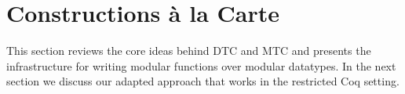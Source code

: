\makeatother
\EndFmtInput
%


























\section{Constructions \`{a} la Carte}
\label{sec:semanticfunctions}


This section reviews the core ideas behind DTC and MTC and presents
the infrastructure for writing modular functions over modular
datatypes. In the next section we discuss our adapted approach that
works in the restricted Coq setting.

